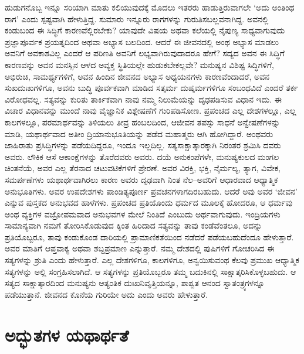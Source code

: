 ಹುಡುಗನೊಬ್ಬ ಇನ್ನೂ ಸರಿಯಾಗಿ ಮಾತು ಕಲಿಯುವುದಕ್ಕೆ ಮೊದಲು ಇತರರು ಹಾಡುತ್ತಿರುವಾಗಲೇ ‘ಅದು ಅಂತಿಂಥ ರಾಗ’ ಎಂದು ಸ್ಪಷ್ಟವಾಗಿ ಹೇಳುತ್ತಿದ್ದ. ಸುಮಾರು ಇನ್ನೂರು ರಾಗಗಳನ್ನು ಗುರುತಿಸಬಲ್ಲವನಾಗಿದ್ದ. ಅವನಲ್ಲಿ ಕಂಡುಬಂದ ಈ ಸಿದ್ಧಿಗೆ ಕಾರಣವೆಲ್ಲಿರಬೇಕು? ಯಾವುದೇ ವಿಷಯ ಅಥವಾ ಕಲೆಯಲ್ಲಿ ನೈಪುಣ್ಯ ಸಾಧ್ಯವಾಗುವುದು ಪ್ರಜ್ಞಾಪೂರ್ವಕ ಪ್ರಯತ್ನದಿಂದ ಅಥವಾ ಅಭ್ಯಾಸ ಬಲದಿಂದ. ಆದರೆ ಈ ಜೀವನದಲ್ಲಿ ಅಂಥ ಅಭ್ಯಾಸ ಮಾಡಲು ಅವನಿಗೆ ಅವಕಾಶವಿಲ್ಲ ಎಂದರೆ ಆ ಪರಿಣತಿ ಅವನಿಗೆ ಲಭ್ಯವಾಗಿರುವುದಾದರೂ ಹೇಗೆ? ಸದ್ಯದ ಅವನ ಈ ಸಿದ್ಧಿಗೆ ಕಾರಣವನ್ನು ಅವನ ಮನಸ್ಸಿನ ಆಳದ ಅವ್ಯಕ್ತ ಸ್ಥಿತಿಯಲ್ಲೇ ಹುಡುಕಬೇಕಲ್ಲವೇ? ಮನುಷ್ಯನ ವಿಶಿಷ್ಟ ಸಿದ್ಧಿಗಳಿಗೆ, ಅಭಿರುಚಿ, ಸಾಮರ್ಥ್ಯಗಳಿಗೆ, ಅವನ ಹಿಂದಿನ ಜೀವನದ ಅಭ್ಯಾಸ ಅಧ್ಯಯನಗಳು ಕಾರಣವೆಂದಾದರೆ, ಅವನ ಸುಖದುಃಖಗಳಿಗೂ, ಅವನು ಬುದ್ಧಿ ಪೂರ್ವಕವಾಗಿ ಮಾಡಿದ ಸತ್ಕರ್ಮ ದುಷ್ಕರ್ಮಗಳಿಗೂ ಸಂಬಂಧವಿದೆ ಎಂದರೆ ತರ್ಕ ವಿರೋಧವಲ್ಲ. ಸತ್ಯವನ್ನು ಕುರಿತು ತಾರ್ಕಿಕವಾಗಿ ನಾವು ನಮ್ಮ ನಿಲುಮೆಯನ್ನು ದೃಢಪಡಿಸುವ ವಿಧಾನ ಇದು. ಈ ವಿಚಾರ ವಿಧಾನವನ್ನು ಮುಂದೆ ನಾವು ವೈಜ್ಞಾನಿಕ ವಿಶ್ಲೇಷಣೆಗೆ ಗುರಿಪಡಿಸೋಣ. ಪ್ರಪಂಚದ ಎಲ್ಲ ದೇಶಗಳಲ್ಲೂ, ಎಲ್ಲ ಕಾಲಗಳಲ್ಲೂ, ಪರಮಾರ್ಥವನ್ನು ತಿಳಿಯಲು ತೀವ್ರ ಹಂಬಲದಿಂದ, ಆಜೀವನ ತಪಸ್ಸು ಸಾಧನೆ ಅನ್ವೇಷಣೆಗಳನ್ನು ಮಾಡಿ, ಯಥಾರ್ಥವಾದ ಅತೀಂ ದ್ರಿಯಾನುಭೂತಿಯನ್ನು ಪಡೆದ ಮಹಾತ್ಮರು ಆಗಿ ಹೋಗಿದ್ದಾರೆ. ಅಂಥವರು ಜಾಹಿರಾತು ಪ್ರಸಿದ್ಧಿಗಳನ್ನು ಪಡೆಯದಿದ್ದರೂ, ಇಂದೂ ಇಲ್ಲದಿಲ್ಲ. ಸತ್ಯಸಾಕ್ಷಾತ್ಕಾರಕ್ಕಾಗಿ ನಿರಂತರ ಶ್ರಮಿಸಿ ದವರು ಅವರು. ಲೌಕಿಕ ಆಸೆ ಆಕಾಂಕ್ಷೆಗಳನ್ನು ತೊರೆದವರು ಅವರು. ದಯೆ ಅನುಕಂಪೆಗಳೇ, ಮನುಷ್ಯಕುಲದ ಮಂಗಲ ಚಿಂತನೆಯೆ, ಅವರ ಎಲ್ಲ ತೆರನಾದ ಚಟುವಟಿಕೆಗಳಿಗೆ ಪ್ರೇರಣೆ. ಅವರ ವಿರಕ್ತಿ, ಭಕ್ತಿ, ನೈರ್ಮಲ್ಯ, ತ್ಯಾಗ, ವಿವೇಕ, ಸಮರ್ಪಣೆಗಳು ಯಥಾರ್ಥವಾಗಿರಲು ಕಾರಣ ಅವರು ದೃಢವಾಗಿ ನಿಂತ ನೆಲ–ಅವರಿಗೆ ಆಧಾರವಾದ ಆಧ್ಯಾತ್ಮಿಕ ಅನುಭೂತಿಗಳು. ಅವರ ಉಪದೇಶಗಳು ಪಾಂಡಿತ್ಯಪೂರ್ಣ ಪ್ರವಚನಗಳಾಗದಿರಬಹುದು. ಆದರೆ ಅವು ಅವರ ‘ಜೀವನ’ ಎನ್ನುವ ಪುಸ್ತಕದ ಅನುಭವದ ಹಾಳೆಗಳು. ಪ್ರಪಂಚದ ಪ್ರತಿಯೊಂದು ಧರ್ಮದ ಮೂಲಕ್ಕೆ ಹೋದರೂ, ಆ ಧರ್ಮವು ಅಂಥ ವ್ಯಕ್ತಿಗಳ ವಜ್ರೋಪಮವಾದ ಅನುಭವಗಳ ಮೇಲೆ ನಿಂತಿದೆ ಎಂಬುದು ಅರ್ಥವಾಗುವುದು. ಇಂದ್ರಿಯಗಳು ಸಾಮಾನ್ಯವಾಗಿ ನಮಗೆ ತೋರಿಸಿಕೊಡುವುದ ಕ್ಕಿಂತ ಹಿರಿದಾದ ಸತ್ಯವನ್ನು ತಾವು ಕಂಡೆವೆಂತಲೂ, ಅದನ್ನು ಪ್ರತಿಯೊಬ್ಬರೂ, ತಾವು ಕಂಡುಕೊಂಡ ದಾರಿಯಲ್ಲಿ ಪ್ರಾಮಾಣಿಕತೆಯಿಂದ ನಡೆದರೆ ಪಡೆಯಬಹುದೆಂದೂ ಹೇಳುತ್ತಾರೆ. ಅವರ ಮಾತಿಗೆ ಆಪ್ತವಾಕ್ಯ ಅಥವಾ ಶಬ್ದಪ್ರಮಾಣ ಎನ್ನುತ್ತಾರೆ. ನಮ್ಮ ದೇಶದಲ್ಲಿ ಪುಷಿಗಳಿಗೆ ಗೋಚರಿಸಿದ ಈ ಸತ್ಯಗಳನ್ನು ಶ್ರುತಿ ಎಂದು ಹೇಳುತ್ತಾರೆ. ಎಲ್ಲ ದೇಶಗಳಿಗೂ, ಕಾಲಗಳಿಗೂ, ಅನ್ವಯಿಸುವಂಥ ಕೆಲವು ಪ್ರಮುಖ ಆಧ್ಯಾತ್ಮಿಕ ಸತ್ಯಗಳನ್ನು ಅಲ್ಲಿ ಸಂಗ್ರಹಿಸಲಾಗಿದೆ. ಆ ಸತ್ಯಗಳನ್ನು ಪ್ರತಿಯೊಬ್ಬರೂ ತಮ್ಮ ಬದುಕಿನಲ್ಲಿ ಸಾಕ್ಷಾತ್ಕರಿಸಿಕೊಳ್ಳಬಹುದು. ಆ ಸತ್ಯದ ಸಾಕ್ಷಾತ್ಕಾರದಿಂದ ಮನುಷ್ಯನು ಆತ್ಯಂತಿಕ ದುಃಖನಿವೃತ್ತಿಯನ್ನೂ, ಶಾಶ್ವತ ಆನಂದ ಸ್ವಾತಂತ್ರ್ಯಗಳನ್ನೂ ಪಡೆಯುತ್ತಾನೆ. ಜೀವನದ ಕೊನೆಯ ಗುರಿಯೇ ಅದು ಎಂದು ಅವರು ಹೇಳುತ್ತಾರೆ.


\section{ಅದ್ಭುತಗಳ ಯಥಾರ್ಥತೆ}

